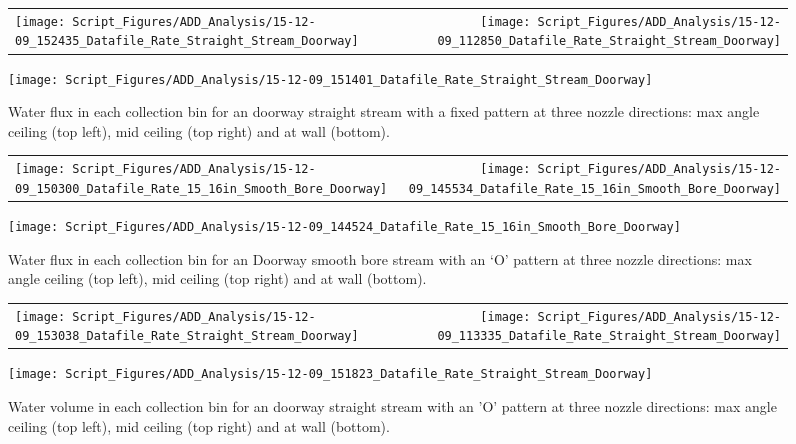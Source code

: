 \documentclass[12pt,oneside]{book}
\begin{document}
\begin{figure}[ht]
\begin{tabular*}{\textwidth}{lr}
\texttt{[image: Script\_Figures/ADD\_Analysis/15-12-09\_152435\_Datafile\_Rate\_Straight\_Stream\_Doorway]} &
\texttt{[image: Script\_Figures/ADD\_Analysis/15-12-09\_112850\_Datafile\_Rate\_Straight\_Stream\_Doorway]} \\
\end{tabular*}
\centering
\texttt{[image: Script\_Figures/ADD\_Analysis/15-12-09\_151401\_Datafile\_Rate\_Straight\_Stream\_Doorway]} 
\caption[Water Flux for Varying Nozzle Direction with Fixed Doorway Straight Stream]{Water flux in each collection bin for an doorway straight stream with a fixed pattern at three nozzle directions: max angle ceiling (top left), mid ceiling (top right) and at wall (bottom).}
\label{fig:Doorway_Varying_Nozzle_Direction_SS_Fixed_Pattern}
\end{figure}

\begin{figure}[ht]
\begin{tabular*}{\textwidth}{lr}
\texttt{[image: Script\_Figures/ADD\_Analysis/15-12-09\_150300\_Datafile\_Rate\_15\_16in\_Smooth\_Bore\_Doorway]} &
\texttt{[image: Script\_Figures/ADD\_Analysis/15-12-09\_145534\_Datafile\_Rate\_15\_16in\_Smooth\_Bore\_Doorway]} \\
\end{tabular*}
\centering
\texttt{[image: Script\_Figures/ADD\_Analysis/15-12-09\_144524\_Datafile\_Rate\_15\_16in\_Smooth\_Bore\_Doorway]}
\caption[Water Flux for Varying Nozzle Direction with `O' Pattern Doorway Smooth Bore Stream]{Water flux in each collection bin for an Doorway smooth bore stream with an `O' pattern at three nozzle directions: max angle ceiling (top left), mid ceiling (top right) and at wall (bottom).}
\label{fig:Doorway_Varying_Nozzle_Direction_SB_O_Pattern}
\end{figure}

\begin{figure}[ht]
\begin{tabular*}{\textwidth}{lr}
\texttt{[image: Script\_Figures/ADD\_Analysis/15-12-09\_153038\_Datafile\_Rate\_Straight\_Stream\_Doorway]} &
\texttt{[image: Script\_Figures/ADD\_Analysis/15-12-09\_113335\_Datafile\_Rate\_Straight\_Stream\_Doorway]} \\
\end{tabular*}
\centering
\texttt{[image: Script\_Figures/ADD\_Analysis/15-12-09\_151823\_Datafile\_Rate\_Straight\_Stream\_Doorway]}
\caption[Water Flux for Varying Nozzle Direction with `O' Doorway Straight Stream]{Water volume in each collection bin for an doorway straight stream with an 'O' pattern at three nozzle directions: max angle ceiling (top left), mid ceiling (top right) and at wall (bottom).}
\label{fig:Doorway_Varying_Nozzle_Direction_SS_O_Pattern}
\end{figure}
\end{document}
